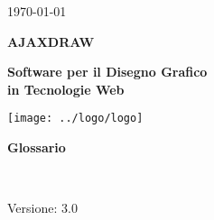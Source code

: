 \usepackage{multirow}

\title{\TITOLODOC}
\author{Mirco Geremia}



\renewcommand{\insertversion}{3.0} %
\renewcommand{\TITOLODOC}{Glossario} %
\renewcommand{\glosspath}{.\glossario} %

\begin{titlepage}
\begin{center}
	\begin{Large}	\today \end{Large}
\end{center}

\vspace{20pt}

\begin{center}
	\begin{Huge}
				\textbf{AJAXDRAW}
	\end{Huge}
\end{center}			

\begin{center}
	\begin{large}
				\textbf{Software per il Disegno Grafico\\ in Tecnologie Web}
	\end{large}
\end{center}			

\vspace{20pt}

\begin{center}
\texttt{[image: ../logo/logo]}
\end{center}

\vspace{170pt}
\begin{center} %
	\begin{Huge}
				\textbf{\TITOLODOC}
	\end{Huge}
			\\
\end{center}
\vspace{200pt}
\begin{center}
Versione: \insertversion
\end{center}
\end{titlepage}

